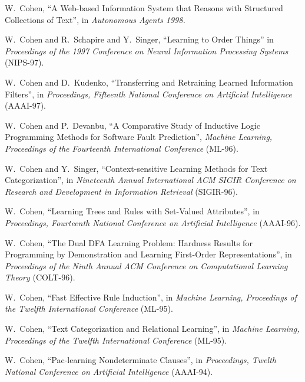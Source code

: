 \item[1998] W.~Cohen, ``A Web-based Information System that Reasons
		with Structured Collections of Text'', in 
		{\em Autonomous Agents 1998.}

\item[1997] W.~Cohen and R.~Schapire and Y.~Singer, ``Learning to
		Order Things'' in {\em Proceedings of the 
		1997 Conference on Neural
		Information Processing Systems} (NIPS-97).

\item[1997] W.~Cohen and D.~Kudenko, ``Transferring and Retraining 
		Learned Information Filters'', in {\em Proceedings, 
		Fifteenth National Conference on
		Artificial Intelligence} (AAAI-97).

\item[1997] W.~Cohen and P.~Devanbu, ``A Comparative Study of 
		Inductive Logic Programming Methods for Software 
		Fault Prediction'', {\em  Machine Learning, Proceedings
		of the Fourteenth International Conference} (ML-96).

\item[1996] W.~Cohen and Y.~Singer, ``Context-sensitive Learning Methods for 
		Text Categorization'', 
		in {\em Nineteenth Annual International ACM SIGIR
		Conference on Research and Development in 
		Information Retrieval} (SIGIR-96). 

\item[1996] W.~Cohen, ``Learning Trees and Rules with Set-Valued Attributes'', 
		in {\em Proceedings, Fourteenth National Conference on
		Artificial Intelligence} (AAAI-96).

\item[1996] W.~Cohen, ``The Dual DFA Learning Problem:
		Hardness Results for Programming by Demonstration
		and Learning First-Order Representations'',
		in {\em Proceedings of the Ninth Annual
		ACM Conference on Computational Learning
		Theory} (COLT-96).

\item[1995] W.~Cohen, ``Fast Effective Rule Induction'', 
		in {\em  Machine Learning, Proceedings
		of the Twelfth International Conference} (ML-95).

\item[1995] W.~Cohen, ``Text Categorization and Relational Learning'', 
		in {\em  Machine Learning, Proceedings
		of the Twelfth International Conference} (ML-95).

\item[1994] W.~Cohen, ``Pac-learning Nondeterminate Clauses'', 
		in {\em Proceedings, Twelth National Conference on
		Artificial Intelligence} (AAAI-94).

